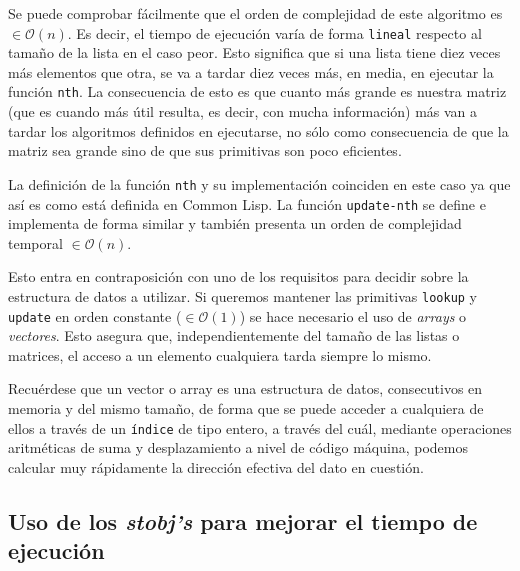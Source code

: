 \documentclass[a4paper,10pt]{article}
\begin{document}
\par \vspace{10pt}

Se puede comprobar fácilmente que el orden de complejidad de este algoritmo es $\in \mathcal{O}(n)$. Es decir, el tiempo de ejecución varía de forma \texttt{lineal} respecto al tamaño de la lista en el caso peor. Esto significa que si una lista tiene diez veces más elementos que otra, se va a tardar diez veces más, en media, en ejecutar la función \texttt{nth}. La consecuencia de esto es que cuanto más grande es nuestra matriz (que es cuando más útil resulta, es decir, con mucha información) más van a tardar los algoritmos definidos en ejecutarse, no sólo como consecuencia de que la matriz sea grande sino de que sus primitivas son poco eficientes.

\par \vspace{10pt}

La definición de la función \texttt{nth} y su implementación coinciden en este caso ya que así es como está definida en Common Lisp. La función \texttt{update-nth} se define e implementa de forma similar y también presenta un orden de complejidad temporal $\in \mathcal{O}(n)$.

\par \vspace{10pt}

Esto entra en contraposición con uno de los requisitos para decidir sobre la estructura de datos a utilizar. Si queremos mantener las primitivas \texttt{lookup} y \texttt{update} en orden constante ($\in \mathcal{O}(1)$) se hace necesario el uso de \emph{arrays} o \emph{vectores}. Esto asegura que, independientemente del tamaño de las listas o matrices, el acceso a un elemento cualquiera tarda siempre lo mismo.  

\par \vspace{10pt}

Recuérdese que un vector o array es una estructura de datos, consecutivos en memoria y del mismo tamaño, de forma que se puede acceder a cualquiera de ellos a través de un \texttt{índice} de tipo entero, a través del cuál, mediante operaciones aritméticas de suma y desplazamiento a nivel de código máquina, podemos calcular muy rápidamente la dirección efectiva del dato en cuestión.

\vspace{12pt}
\subsection{Uso de los \emph{stobj's} para mejorar el tiempo de ejecución}
\vspace{10pt}
\end{document}
